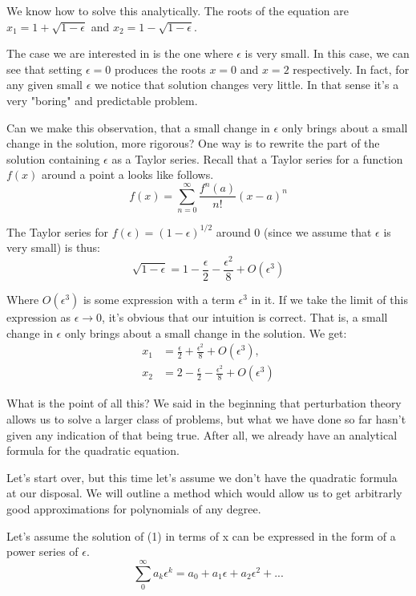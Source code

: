 \documentclass[12pt]{article}
\begin{document}
We know how to solve this analytically. The roots of the equation are $x_1 = 1 +
\sqrt{1 - \epsilon}$ and $x_2 = 1 - \sqrt{1 - \epsilon}$.

The case we are interested in is the one where $\epsilon$ is very small. In this
case, we can see that setting $\epsilon=0$ produces the roots $x=0$ and $x=2$
respectively. In fact, for any given small $\epsilon$ we notice that solution
changes very little. In that sense it's a very "boring" and predictable problem.

Can we make this observation, that a small change in $\epsilon$ only brings about a small change in the solution, more rigorous? One way is to rewrite the part
of the solution containing $\epsilon$ as a Taylor series. Recall that a Taylor
series for a function $f(x)$ around a point a looks like follows.
\begin{equation}
f(x) = \sum_{n=0}^{\infty} \frac{f^{n}(a)}{n!} (x-a)^n
\end{equation}

The Taylor series for $f(\epsilon) = (1 - \epsilon)^{1/2}$ around 0
(since we assume that $\epsilon$ is very small) is thus:
\begin{equation}
\sqrt{1 - \epsilon} = 1 - \frac{\epsilon}{2} - \frac{\epsilon^2}{8} + O(\epsilon^3)
\end{equation}

Where $O(\epsilon^3)$ is some expression with a term $\epsilon^3$ in
it. If we take the limit of this expression as $\epsilon \to 0$, it's
obvious that our intuition is correct. That is, a small change in
$\epsilon$ only brings about a small change in the solution. We get:
\begin{align}
x_1 &= \frac{\epsilon}{2} + \frac{\epsilon^2}{8} + O(\epsilon^3), \\
x_2 &= 2 - \frac{\epsilon}{2} - \frac{\epsilon^2}{8} + O(\epsilon^3)
\end{align}

What is the point of all this? We said in the beginning that perturbation theory
allows us to solve a larger class of problems, but what we have done so far
hasn't given any indication of that being true. After all, we already have an
analytical formula for the quadratic equation.

Let's start over, but this time let's assume we don't have the quadratic formula
at our disposal. We will outline a method which would allow us to get arbitrarly
good approximations for polynomials of any degree.

Let's assume the solution of (1) in terms of x can be expressed in the
form of a power series of $\epsilon$.
\begin{equation}
\sum_0^{\infty} a_k \epsilon^k = a_0 + a_1 \epsilon + a_2 \epsilon^2 + ...
\end{equation}
\end{document}
